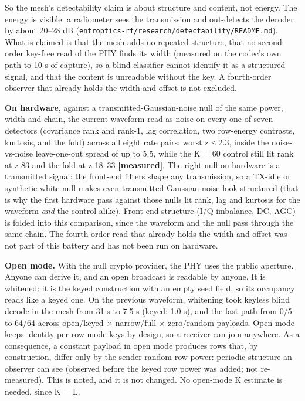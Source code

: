 \documentclass[10pt,letterpaper,twocolumn]{article}
\begin{document}
So the mesh's detectability claim is about structure and content, not energy. The energy is visible: a radiometer sees the transmission and out-detects the decoder by about 20--28 dB (\texttt{entroptics-{}\allowbreak{}rf/\allowbreak{}research/\allowbreak{}detectability/\allowbreak{}README.\allowbreak{}md}). What is claimed is that the mesh adds no repeated structure, that no second-order key-free read of the PHY finds its width (measured on the codec's own path to 10 s of capture), so a blind classifier cannot identify it as a structured signal, and that the content is unreadable without the key. A fourth-order observer that already holds the width and offset is not excluded.

\textbf{On hardware}, against a transmit\allowbreak{}ted-\allowbreak{}Gaussian\allowbreak{}-\allowbreak{}noise null of the same power, width and chain, the current waveform read as noise on every one of seven detectors (covariance rank and rank-1, lag correlation, two row-energy contrasts, kurtosis, and the fold) across all eight rate pairs: worst \textbar z\textbar{} ≤ 2.3, inside the noise-vs-noise leave-one-out spread of up to 5.5, while the K = 60 control still lit rank at z 83 and the fold at z 18--33 \textbf{{[}measured{]}}. The right null on hardware is a transmitted signal: the front-end filters shape any transmission, so a TX-idle or synthetic-white null makes even transmitted Gaussian noise look structured (that is why the first hardware pass against those nulls lit rank, lag and kurtosis for the waveform \emph{and} the control alike). Front-end structure (I/Q imbalance, DC, AGC) is folded into this comparison, since the waveform and the null pass through the same chain. The fourth-order read that already holds the width and offset was not part of this battery and has not been run on hardware.

\textbf{Open mode.} With the null crypto provider, the PHY uses the public aperture. Anyone can derive it, and an open broadcast is readable by anyone. It is whitened: it is the keyed construction with an empty seed field, so its occupancy reads like a keyed one. On the previous waveform, whitening took keyless blind decode in the mesh from 31 s to 7.5 s (keyed: 1.0 s), and the fast path from 0/5 to 64/64 across open/keyed × narrow/full × zero/random payloads. Open mode keeps identity per-row mode keys by design, so a receiver can join anywhere. As a consequence, a constant payload in open mode produces rows that, by construction, differ only by the sender-random row power: periodic structure an observer can see (observed before the keyed row power was added; not re-measured). This is noted, and it is not changed. No open-mode K estimate is needed, since K = L.
\end{document}
